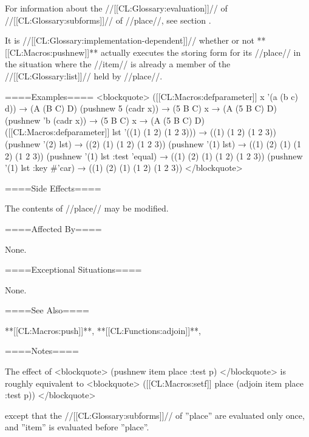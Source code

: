 For information about the //[[CL:Glossary:evaluation]]// of //[[CL:Glossary:subforms]]// of //place//, see section {\secref\GenRefSubFormEval}.

It is //[[CL:Glossary:implementation-dependent]]// whether or not **[[CL:Macros:pushnew]]** actually executes the storing form for its //place// in the situation where the //item// is already a member of the //[[CL:Glossary:list]]// held by //place//.

====Examples==== <blockquote> ([[CL:Macros:defparameter]] x '(a (b c) d)) → (A (B C) D) (pushnew 5 (cadr x)) → (5 B C) x → (A (5 B C) D) (pushnew 'b (cadr x)) → (5 B C) x → (A (5 B C) D) ([[CL:Macros:defparameter]] lst '((1) (1 2) (1 2 3))) → ((1) (1 2) (1 2 3)) (pushnew '(2) lst) → ((2) (1) (1 2) (1 2 3)) (pushnew '(1) lst) → ((1) (2) (1) (1 2) (1 2 3)) (pushnew '(1) lst :test 'equal) → ((1) (2) (1) (1 2) (1 2 3)) (pushnew '(1) lst :key #'car) → ((1) (2) (1) (1 2) (1 2 3)) </blockquote>

====Side Effects====

The contents of //place// may be modified.

====Affected By====

None.

====Exceptional Situations====

None.

====See Also====

**[[CL:Macros:push]]**, **[[CL:Functions:adjoin]]**, {\secref\GeneralizedReference}

====Notes====

The effect of <blockquote> (pushnew item place :test p) </blockquote> is roughly equivalent to <blockquote> ([[CL:Macros:setf]] place (adjoin item place :test p)) </blockquote>

except that the //[[CL:Glossary:subforms]]// of ''place'' are evaluated only once, and ''item'' is evaluated before ''place''.

  
